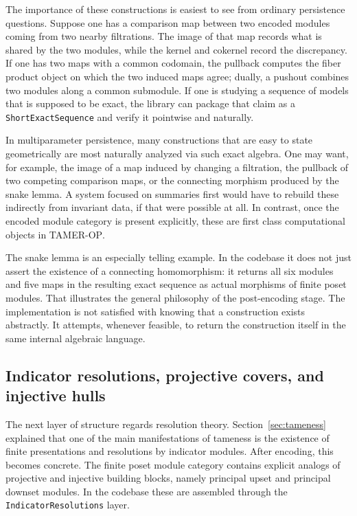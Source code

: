 \documentclass[11pt]{article}
\newcommand{\TAMER}{\textsc{TAMER-OP}}
\theoremstyle{definition}
\theoremstyle{remark}
\begin{document}
The importance of these constructions is easiest to see from ordinary persistence questions.  Suppose one has a comparison map between two encoded modules coming from two nearby filtrations.  The image of that map records what is shared by the two modules, while the kernel and cokernel record the discrepancy.  If one has two maps with a common codomain, the pullback computes the fiber product object on which the two induced maps agree; dually, a pushout combines two modules along a common submodule. If one is studying a sequence of models that is supposed to be exact, the library can package that claim as a \texttt{ShortExactSequence} and verify it pointwise and naturally.

In multiparameter persistence, many constructions that are easy to state geometrically are most naturally analyzed via such exact algebra.  One may want, for example, the image of a map induced by changing a filtration, the pullback of two competing comparison maps, or the connecting morphism produced by the snake lemma.  A system focused on summaries first would have to rebuild these indirectly from invariant data, if that were possible at all. In contrast, once the encoded module category is present explicitly, these are first class computational objects in \TAMER.

The snake lemma is an especially telling example.  In the codebase it does not just assert the existence of a connecting homomorphism: it returns all six modules and five maps in the resulting exact sequence as actual morphisms of finite poset modules.  That illustrates the general philosophy of the post-encoding stage.  The implementation is not satisfied with knowing that a construction exists abstractly.  It attempts, whenever feasible, to return the construction itself in the same internal algebraic language.

\subsection{Indicator resolutions, projective covers, and injective hulls}

The next layer of structure regards resolution theory.  Section~\ref{sec:tameness} explained that one of the main manifestations of tameness is the existence of finite presentations and resolutions by indicator modules.  After encoding, this becomes concrete.  The finite poset module category contains explicit analogs of projective and injective building blocks, namely principal upset and principal downset modules.  In the codebase these are assembled through the \texttt{IndicatorResolutions} layer.
\end{document}
